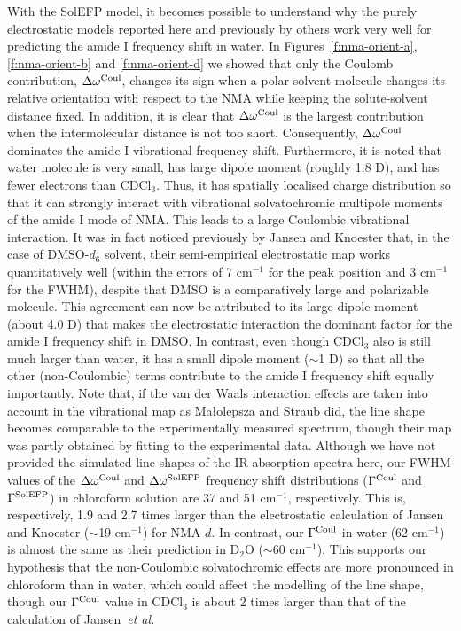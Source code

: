 \documentclass[b5paper,oneside,fleqn,11pt]{book}
\begin{document}
\begin{refsection}
With the SolEFP model, it becomes possible to understand
why the purely electrostatic models reported here and
previously by others work very well for predicting the amide
I frequency shift in water. In Figures~\ref{f:nma-orient-a}, 
\ref{f:nma-orient-b} and \ref{f:nma-orient-d} we showed that only the Coulomb
contribution, $\Delta\omega^{\rm Coul}$, changes its sign when a polar solvent
molecule changes its relative orientation with respect to the
NMA while keeping the solute\hyp{}solvent distance fixed. In
addition, it is clear
that $\Delta\omega^{\rm Coul}$ is the largest contribution when the intermolecular
distance is not too short. Consequently, $\Delta\omega^{\rm Coul}$ dominates the
amide I vibrational frequency shift. Furthermore, it is noted
that water molecule is very small, has large dipole moment
(roughly 1.8 D), and has fewer electrons than CDCl$_3$. Thus,
it has spatially localised charge distribution so that it can
strongly interact with vibrational solvatochromic multipole
moments of the amide I mode of NMA. This leads to
a large Coulombic vibrational interaction. It was in fact
noticed previously by Jansen and Knoester \citep{Jansen.Knoester.JCP.2006} 
that, in the case
of DMSO-$d_6$ solvent, their semi\hyp{}empirical electrostatic map
works quantitatively well (within the errors of 7 cm$^{-1}$ for
the peak position and 3 cm$^{-1}$ for the FWHM), despite that
DMSO is a comparatively large and polarizable molecule.
This agreement can now be attributed to its large dipole
moment (about 4.0 D) that makes the electrostatic interaction
the dominant factor for the amide I frequency shift in DMSO.
In contrast, even though CDCl$_3$ also is still much larger
than water, it has a small dipole moment ($\sim$1 D) so that
all the other (non\hyp{}Coulombic) terms contribute to the amide
I frequency shift equally importantly. Note that, if the van
der Waals interaction effects are taken into account in the
vibrational map as Ma{\l}olepsza and Straub \citep{Malolepsza.Straub.JPCB.2014} did, the line
shape becomes comparable to the experimentally measured
spectrum, though their map was partly obtained by fitting to
the experimental data. Although we have not provided the
simulated line shapes of the IR absorption spectra here, our
FWHM values of the $\Delta\omega^{\rm Coul}$ and $\Delta\omega^{\rm SolEFP}$ frequency shift
distributions ($\Gamma^{\rm Coul}$ and $\Gamma^{\rm SolEFP}$) in chloroform solution are 37
and 51 cm$^{-1}$, respectively. This is, respectively, 1.9 and 2.7
times larger than the electrostatic calculation of Jansen and
Knoester ($\sim$19 cm$^{-1}$) for NMA-$d$. \citep{Jansen.Knoester.JCP.2006,Jansen.JPCB.2014} 
In contrast, our $\Gamma^{\rm Coul}$
in water (62 cm$^{-1}$) is almost the same as their prediction
in D$_2$O ($\sim$60 cm$^{-1}$). \citep{Jansen.Knoester.JCP.2006} 
This supports our hypothesis that the
non\hyp{}Coulombic solvatochromic effects are more pronounced
in chloroform than in water, which could affect the modelling
of the line shape, though our $\Gamma^{\rm Coul}$ value in CDCl$_3$ is about 2
times larger than that of the calculation of Jansen~\emph{et al.}


\end{refsection}
\end{document}
